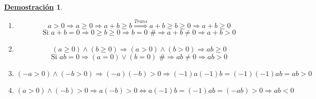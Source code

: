 \documentclass[10pt,a4paper,openright]{book}
\theoremstyle{break}
\newtheorem*{demo}{\underline{Demostración}}
\begin{document}
\begin{demo}
\begin{enumerate}
\item $$a>0\Rightarrow a\geq 0\Rightarrow a+b\geq b \stackrel{Trans}{\Rightarrow} a+b\geq b\geq 0 \Rightarrow a+b\geq 0$$
$$\mbox{Si } a+b=0 \Rightarrow 0\geq b\geq 0\Rightarrow b=0 \mbox{ \#}\Rightarrow a+b\neq 0 \Rightarrow a+b>0$$
\item $$(a\geq 0) \wedge (b\geq 0)\Rightarrow (a>0) \wedge (b>0) \Rightarrow ab\geq 0$$
$$\mbox{Si }ab=0\Rightarrow (a=0)\vee (b=0)\mbox{ \#}\Rightarrow ab\neq 0 \Rightarrow ab>0$$
\item $$(-a>0)\wedge (-b>0)\Rightarrow (-a)(-b)>0\Rightarrow (-1)a(-1)b=(-1)(-1)ab=ab>0$$
\item $$(a>0)\wedge(-b)>0\Rightarrow a(-b)>0\Leftrightarrow a(-1)b=(-1)ab=(-ab)>0\Rightarrow ab<0$$
\end{enumerate}


\end{demo}
\end{document}
